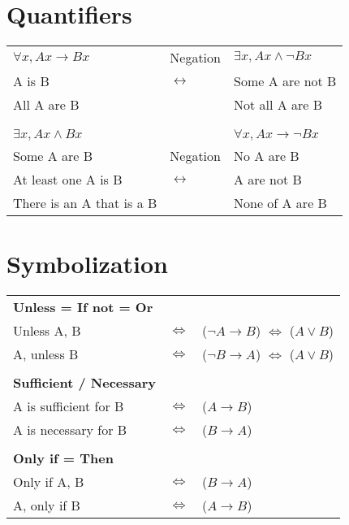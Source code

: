 \documentclass{article}
\begin{document}
\section{Quantifiers}
\begin{tabular}{p{4cm}>{\centering}p{2cm}>{\raggedleft\arraybackslash}p{3.5cm}} 
$\forall x, Ax\to Bx$ & Negation & $\exists x, Ax\wedge \neg Bx$ \\
A is B & $\longleftrightarrow$ & Some A are not B \\ 
All A are B & & Not all A are B \\
& & \\
\hline
& & \\
$\exists x, Ax\wedge Bx$ & & $\forall x, Ax\to \neg Bx$ \\
Some A are B & Negation & No A are B\\ 
At least one A is B & $\longleftrightarrow$ & A are not B\\
There is an A that is a B & & None of A are B\\
\end{tabular}


\section{Symbolization}
\begin{tabular}{lll}
\textbf{Unless = If not = Or}\\
Unless A, B & $\Longleftrightarrow$ & ($\neg A \to B$) $\Longleftrightarrow$ ($A \vee B$)\\
A, unless B & $\Longleftrightarrow$ & ($\neg B \to A$) $\Longleftrightarrow$ ($A \vee B$)\\
& & \\
\textbf{Sufficient / Necessary}\\
A is sufficient for B & $\Longleftrightarrow$ & ($A \to B$)\\
A is necessary for B & $\Longleftrightarrow$ & ($B \to A$)\\
& & \\
\textbf{Only if = Then}\\
Only if A, B & $\Longleftrightarrow$ & ($B \to A$)\\
A, only if B & $\Longleftrightarrow$ & ($A \to B$)\\
\end{tabular}
\end{document}
